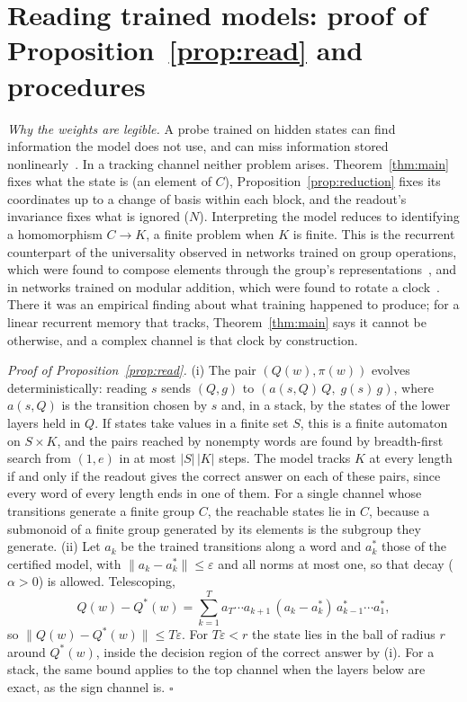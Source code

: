 \documentclass[aps,prx,reprint,superscriptaddress,longbibliography,nofootinbib,floatfix]{revtex4-2}
\theoremstyle{plain}
\theoremstyle{definition}
\begin{document}
\section{Reading trained models: proof of Proposition~\ref{prop:read} and procedures}\label{sm:interp}

\emph{Why the weights are legible.} A probe trained on hidden states can
find information the model does not use, and can miss information stored
nonlinearly~\cite{li_othello}. In a tracking channel neither problem
arises. Theorem~\ref{thm:main} fixes what the state is (an element of $C$),
Proposition~\ref{prop:reduction} fixes its coordinates up to a change of
basis within each block, and the readout's invariance fixes what is ignored
($N$). Interpreting the model reduces to identifying a homomorphism
$C\to K$, a finite problem when $K$ is finite. This is the recurrent
counterpart of the universality observed in networks trained on group
operations, which were found to compose elements through the group's
representations~\cite{chughtai_universality}, and in networks trained on
modular addition, which were found to rotate a clock~\cite{nanda_grokking}.
There it was an empirical finding about what training happened to produce;
for a linear recurrent memory that tracks, Theorem~\ref{thm:main} says it
cannot be otherwise, and a complex channel is that clock by construction.

\emph{Proof of Proposition~\ref{prop:read}.} (i) The pair
$(Q(w),\pi(w))$ evolves deterministically: reading $s$ sends $(Q,g)$ to
$(a(s,Q)\,Q,\;g(s)\,g)$, where $a(s,Q)$ is the transition chosen by $s$ and,
in a stack, by the states of the lower layers held in $Q$. If states take
values in a finite set $S$, this is a finite automaton on $S\times K$, and
the pairs reached by nonempty words are found by breadth-first search from
$(1,e)$ in at most $|S|\,|K|$ steps. The model tracks $K$ at every length if
and only if the readout gives the correct answer on each of these pairs,
since every word of every length ends in one of them. For a single channel
whose transitions generate a finite group $C$, the reachable states lie in
$C$, because a submonoid of a finite group generated by its elements is the
subgroup they generate. (ii) Let $a_k$ be the trained transitions along a
word and $a^*_k$ those of the certified model, with
$\|a_k-a^*_k\|\le\varepsilon$ and all norms at most one, so that decay
($\alpha>0$) is allowed. Telescoping,
\begin{equation}
Q(w)-Q^*(w)=\sum_{k=1}^{T} a_T\cdots a_{k+1}\,(a_k-a^*_k)\,a^*_{k-1}\cdots a^*_1,
\label{eq:telescope}
\end{equation}
so $\|Q(w)-Q^*(w)\|\le T\varepsilon$. For $T\varepsilon<r$ the state lies in
the ball of radius $r$ around $Q^*(w)$, inside the decision region of the
correct answer by (i). For a stack, the same bound applies to the top
channel when the layers below are exact, as the sign channel is. $\square$
\end{document}
